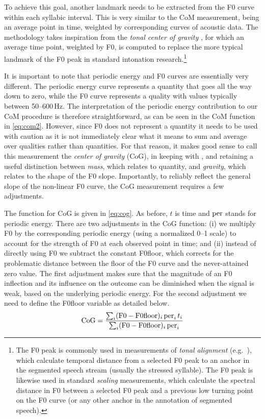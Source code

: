 To achieve this goal, another landmark needs to be extracted from the F0 curve within each syllabic interval. This is very similar to the CoM measurement, being an average point in time, weighted by corresponding curves of acoustic data. The methodology takes inspiration from the \emph{tonal center of gravity} \citep{barnes2012tonal}, for which an average time point, weighted by F0, is computed to replace the more typical landmark of the F0 peak in standard intonation research.\footnote{The F0 peak is commonly used in measurements of \emph{tonal alignment} (e.g.~\citealt{arvaniti2006tonalsk}), which calculate temporal distance from a selected F0 peak to an anchor in the segmented speech stream (usually the stressed syllable). The F0 peak is likewise used in standard \emph{scaling} measurements, which calculate the spectral distance in F0 between a selected F0 peak and a previous low turning point on the F0 curve (or any other anchor in the annotation of segmented speech).}

It is important to note that periodic energy and F0 curves are essentially very different. The periodic energy curve represents a quantity that goes all the way down to zero, while the F0 curve represents a quality with values typically between 50--600\,Hz. The interpretation of the periodic energy contribution to our CoM procedure is therefore straightforward, as can be seen in the CoM function in \eqref{eq:com2}. However, since F0 does not represent a quantity it needs to be used with caution as it is not immediately clear what it means to sum and average over qualities rather than quantities. For that reason, it makes good sense to call this measurement the \emph{center of gravity} (CoG), in keeping with \citet{barnes2012tonal}, and retaining a useful distinction between \emph{mass}, which relates to quantity, and \emph{gravity}, which relates to the shape of the F0 slope.
Importantly, to reliably reflect the general slope of the non-linear F0 curve, the CoG measurement requires a few adjustments.

The function for CoG is given in \eqref{eq:cog}. As before, \(t\) is time and \(\operatorname{per}\) stands for periodic energy. There are two adjustments in the CoG function:
(i) we multiply F0 by the corresponding periodic energy (using a normalized 0--1 scale) to account for the strength of F0 at each observed point in time; and
(ii) instead of directly using
F0 we subtract the constant F0floor, %
which corrects for the problematic distance between the floor of the F0 curve and the never-attained zero value.
The first adjustment makes sure that the magnitude of an F0 inflection and its influence on the outcome can be diminished when the signal is weak, based on the underlying periodic energy. For the second adjustment we need to define the F0floor variable as detailed below.
\begin{equation}
 \text{CoG} = \frac{\sum_i (\text{F0}-\text{F0floor})_i \operatorname{per}_i t_i}{\sum_i (\text{F0}-\text{F0floor})_i \operatorname{per}_i}  \label{eq:cog}
\end{equation}

